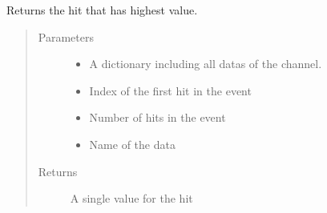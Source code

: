 \documentclass[letterpaper,10pt,english]{sphinxmanual}
\begin{document}
\begin{fulllineitems}
\label{\detokenize{autodocs/data:listmode.data.max_combinator}}
\sphinxAtStartPar
Returns the hit that has highest value.
\begin{quote}\begin{description}
\item[{Parameters}] \leavevmode\begin{itemize}
\item {} 
\sphinxAtStartPar
{} \textendash{} A dictionary including all datas of the channel.

\item {} 
\sphinxAtStartPar
{} \textendash{} Index of the first hit in the event

\item {} 
\sphinxAtStartPar
{} \textendash{} Number of hits in the event

\item {} 
\sphinxAtStartPar
{} \textendash{} Name of the data

\end{itemize}

\item[{Returns}] \leavevmode
\sphinxAtStartPar
A single value for the hit

\end{description}\end{quote}

\end{fulllineitems}

\end{document}

